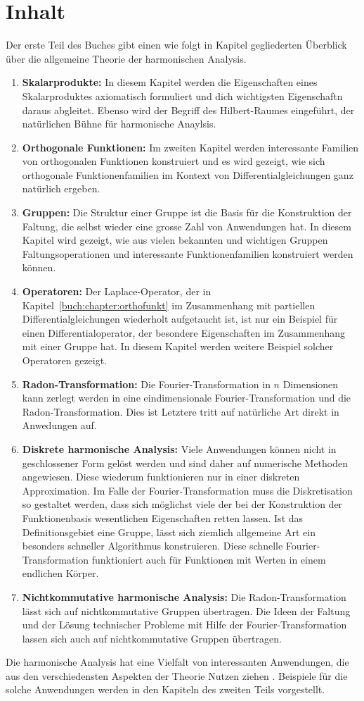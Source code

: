 %
%
%
\section{Inhalt
\label{buch:einleitung:section:inhalt}}
Der erste Teil des Buches gibt einen wie folgt in Kapitel gegliederten
Überblick über die allgemeine Theorie der harmonischen Analysis.

\begin{enumerate}
\item {\bf Skalarprodukte:}
In diesem Kapitel werden die Eigenschaften eines Skalarproduktes 
axiomatisch formuliert und dich wichtigsten Eigenschaftn daraus
abgleitet.
Ebenso wird der Begriff des Hilbert-Raumes eingeführt, der natürlichen
Bühne für harmonische Anaylsis.
\item {\bf Orthogonale Funktionen:}
Im zweiten Kapitel werden interessante Familien von orthogonalen
Funktionen konstruiert und es wird gezeigt, wie sich orthogonale
Funktionenfamilien im Kontext von Differentialgleichungen ganz natürlich
ergeben.
\item {\bf Gruppen:}
Die Struktur einer Gruppe ist die Basis für die Konstruktion der Faltung,
die selbst wieder eine grosse Zahl von Anwendungen hat.
In diesem Kapitel wird gezeigt, wie aus vielen bekannten und wichtigen
Gruppen Faltungsoperationen und interessante Funktionenfamilien
konstruiert werden können.
\item {\bf Operatoren:}
Der Laplace-Operator, der in Kapitel~\ref{buch:chapter:orthofunkt}
im Zusammenhang mit partiellen Differentialgleichungen wiederholt
aufgetaucht ist, ist nur ein Beispiel für einen Differentialoperator,
der besondere Eigenschaften im Zusammenhang mit einer Gruppe hat.
In diesem Kapitel werden weitere Beispiel solcher Operatoren gezeigt.
\item {\bf Radon-Transformation:}
Die Fourier-Transformation in $n$ Dimensionen kann zerlegt werden in
eine eindimensionale Fourier-Transformation und die Radon-Transformation.
Dies ist 
Letztere tritt auf natürliche Art direkt in Anwedungen auf.
\item {\bf Diskrete harmonische Analysis:}
Viele Anwendungen können nicht in geschlossener Form gelöst werden
und sind daher auf numerische Methoden angewiesen.
Diese wiederum funktionieren nur in einer diskreten Approximation.
Im Falle der Fourier-Transformation muss die Diskretisation so gestaltet
werden, dass sich möglichst viele der bei der Konstruktion der Funktionenbasis
wesentlichen Eigenschaften retten lassen.
Ist das Definitionsgebiet eine Gruppe, lässt sich ziemlich allgemeine
Art ein besonders schneller Algorithmus konstruieren.
Diese schnelle Fourier-Transformation funktioniert auch für Funktionen
mit Werten in einem endlichen Körper.
\item {\bf Nichtkommutative harmonische Analysis:}
Die Radon-Transformation lässt sich auf nichtkommutative Gruppen
übertragen.
Die Ideen der Faltung und der Lösung technischer Probleme mit Hilfe
der Fourier-Transformation lassen sich auch auf nichtkommutative
Gruppen übertragen.
\end{enumerate}

Die harmonische Analysis hat eine Vielfalt von interessanten
Anwendungen, die aus den verschiedensten Aspekten der Theorie
Nutzen ziehen .
Beispiele für die solche Anwendungen werden in den Kapiteln
des zweiten Teils vorgestellt.

